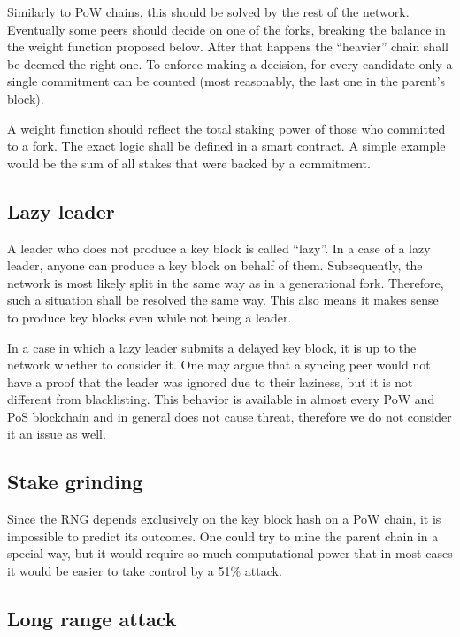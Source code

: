 Similarly to PoW chains, this should be solved by the rest of the network.
Eventually some peers should decide on one of the forks, breaking the balance in
the weight function proposed below. After that happens the ``heavier'' chain
shall be deemed the right one. To enforce making a decision, for every candidate
only a single commitment can be counted (most reasonably, the last one in the
parent's block).

A weight function should reflect the total staking power of those who committed
to a fork. The exact logic shall be defined in a smart contract. A simple
example would be the sum of all stakes that were backed by a commitment.

\subsection{Lazy leader}

A leader who does not produce a key block is called ``lazy''. In a case of a
lazy leader, anyone can produce a key block on behalf of them. Subsequently, the
network is most likely split in the same way as in a generational fork.
Therefore, such a situation shall be resolved the same way. This also means it
makes sense to produce key blocks even while not being a leader.

In a case in which a lazy leader submits a delayed key block, it is up to the
network whether to consider it. One may argue that a syncing peer would not have
a proof that the leader was ignored due to their laziness, but it is not
different from blacklisting. This behavior is available in almost every PoW and
PoS blockchain and in general does not cause threat, therefore we do not
consider it an issue as well.

\subsection{Stake grinding}

Since the RNG depends exclusively on the key block hash on a PoW chain, it is
impossible to predict its outcomes. One could try to mine the parent chain in a
special way, but it would require so much computational power that in most cases
it would be easier to take control by a 51\% attack.

\subsection{Long range attack}

